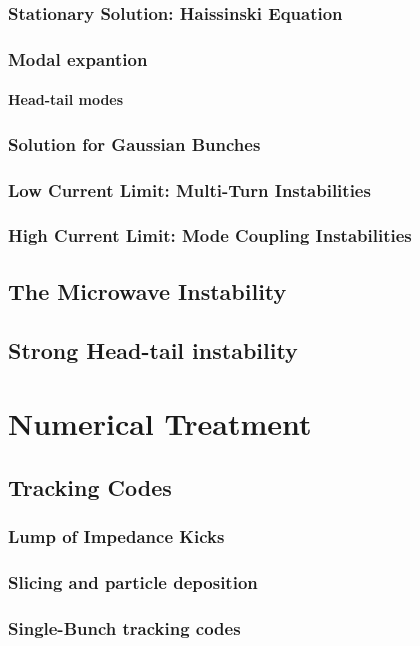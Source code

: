 \documentclass[
	12pt,				%
	openright,			%
	oneside,			%
	a4paper,		%
	chapter=TITLE,		%
	section=TITLE,		%
    brazil,				%
	english,			%
	sumario=tradicional,
	]{abntex2}
\begin{document}
      \subsubsection{Stationary Solution: Haissinski Equation}
      \subsubsection{Modal expantion}
        \paragraph{Head-tail modes}
      \subsubsection{Solution for Gaussian Bunches}
      \subsubsection{Low Current Limit: Multi-Turn Instabilities}
      \subsubsection{High Current Limit: Mode Coupling Instabilities}
    \subsection{The Microwave Instability}
    \subsection{Strong Head-tail instability}
  \section{Numerical Treatment}
    \subsection{Tracking Codes}
      \subsubsection{Lump of Impedance Kicks}
      \subsubsection{Slicing and particle deposition}
      \subsubsection{Single-Bunch tracking codes}
\end{document}
